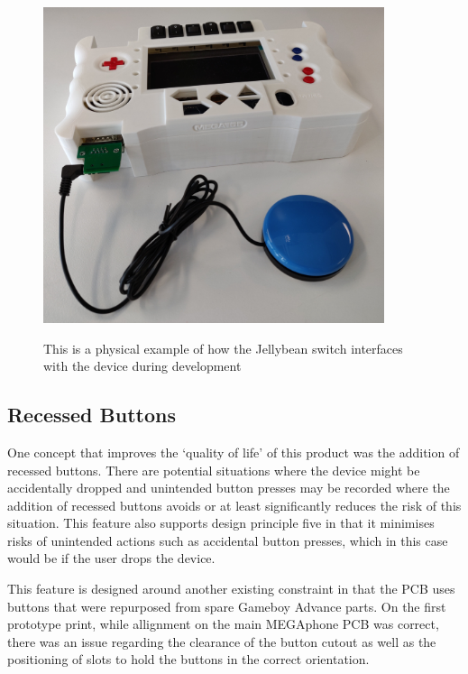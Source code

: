 \begin{figure}[hbt!]
\centering
\includegraphics[width=10cm,height=10cm,keepaspectratio]{Figures/jellybean.jpg}
\caption{This is a physical example of how the Jellybean switch interfaces with the device during development}
\label{fig:Jellybean}
\end{figure}

\subsection{Recessed Buttons}

One concept that improves the ‘quality of life’ of this product was the addition of recessed buttons.
There are potential situations where the device might be accidentally dropped and unintended button presses may be recorded where the addition of recessed buttons avoids or at least significantly reduces the risk of this situation.
This feature also supports design principle five in that it minimises risks of unintended actions such as accidental button presses, which in this case would be if the user drops the device.

This feature is designed around another existing constraint in that the PCB uses buttons that were repurposed from spare Gameboy Advance parts. %
On the first prototype print, while allignment on the main MEGAphone PCB was correct, there was an issue regarding the clearance of the button cutout as well as the positioning of slots to hold the buttons in the correct orientation.

